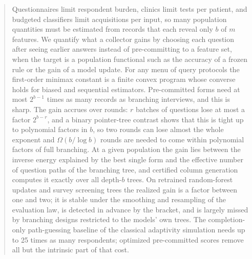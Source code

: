 \documentclass{article}
\begin{document}
\printAffiliationsAndNotice{}

\begin{abstract}
Questionnaires limit respondent burden, clinics limit tests per patient, and budgeted classifiers limit acquisitions per input, so many population quantities must be estimated from records that each reveal only $b$ of $m$ features. We quantify what a collector gains by choosing each question after seeing earlier answers instead of pre-committing to a feature set, when the target is a population functional such as the accuracy of a frozen rule or the gain of a model update. For any menu of query protocols the first-order minimax constant is a finite convex program whose converse holds for biased and sequential estimators. Pre-committed forms need at most $2^{b-1}$ times as many records as branching interviews, and this is sharp. The gain accrues over rounds: $r$ batches of questions lose at most a factor $2^{b-r}$, and a binary pointer-tree contrast shows that this is tight up to polynomial factors in $b$, so two rounds can lose almost the whole exponent and $\Omega(b/\log b)$ rounds are needed to come within polynomial factors of full branching. At a given population the gain lies between the inverse energy explained by the best single form and the effective number of question paths of the branching tree, and certified column generation computes it exactly over all depth-$b$ trees. On retrained random-forest updates and survey screening trees the realized gain is a factor between one and two; it is stable under the smoothing and resampling of the evaluation law, is detected in advance by the bracket, and is largely missed by branching designs restricted to the models' own trees. The completion-only path-guessing baseline of the classical adaptivity simulation needs up to 25 times as many respondents; optimized pre-committed scores remove all but the intrinsic part of that cost.
\end{abstract}
\end{document}
